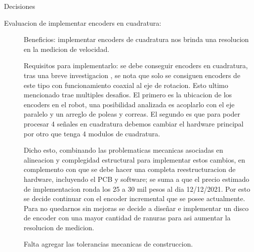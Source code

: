 \begin{titlepage}
    {\LARGE Decisiones}

    
    \begin{description}
        \item[Evaluacion de implementar encoders en cuadratura:] 
        Beneficios: implementar encoders de cuadratura nos brinda una resolucion en la medicion de velocidad.

        Requisitos para implementarlo: se debe conseguir encoders en cuadratura, tras una breve investigacion , se nota que solo se consiguen encoders de este tipo con funcionamiento coaxial al eje de rotacion. 
        Esto ultimo mencionado trae multiples desafios.
        El primero es la ubicacion de los encoders en el robot, una posibilidad analizada es acoplarlo con el eje paralelo y un arreglo de poleas y correas.
        El segundo es que para poder procesar 4 señales en cuadratura debemos cambiar el hardware principal por otro que tenga 4 modulos de cuadratura.

        Dicho esto, combinando las problematicas mecanicas asociadas en alineacion y complegidad estructural para implementar estos cambios, en complemento con que se debe hacer una completa reestructuracion de hardware, incluyendo el PCB y software; se suma a que el precio estimado de implementacion ronda los 25 a 30 mil pesos al dia 12/12/2021.
        Por esto se decide continuar con el encoder incremental que se posee actualmente.
        Para no quedarnos sin mejoras se decide a diseñar e implementar un disco de encoder con una mayor cantidad de ranuras para asi aumentar la resolucion de medicion.

        Falta agregar las tolerancias mecanicas de construccion.
        \item[] 
        \item[] 
    \end{description}
\end{titlepage}
